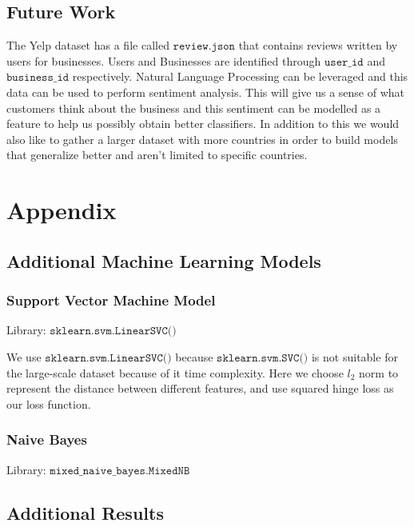 \documentclass{article}
\begin{document}
\subsection{Future Work}
The Yelp dataset has a file called $\texttt{review.json}$ that contains reviews written by users for businesses. Users and Businesses are identified through $\texttt{user\_id}$ and $\texttt{business\_id}$ respectively. Natural Language Processing can be leveraged and this data can be used to perform sentiment analysis. This will give us a sense of what customers think about the business and this sentiment can be modelled as a feature to help us possibly obtain better classifiers. In addition to this we would also like to gather a larger dataset with more countries in order to build models that generalize better and aren't limited to specific countries. 







\pagebreak

\nocite{*}





\newpage
\section{Appendix}

\subsection{Additional Machine Learning Models}
\subsubsection{Support Vector Machine Model}
Library:  $\texttt{sklearn.svm.LinearSVC()}$~\cite{SVM, svm_sklearn}

We use $\texttt{sklearn.svm.LinearSVC()}$ because $\texttt{sklearn.svm.SVC()}$ is not suitable for the large-scale dataset because of it time complexity. Here we choose $l_2$ norm to represent the distance between different features, and use squared hinge loss as our loss function.


\subsubsection{Naive Bayes}
Library:  $\texttt{mixed\_naive\_bayes.MixedNB}$~\cite{nblib}


\subsection{Additional Results}
\end{document}
